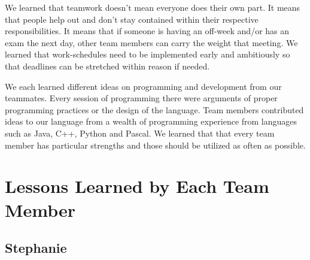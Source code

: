 \documentclass[12pt]{report}
\begin{document}
We learned that teamwork doesn't mean everyone does their own part. It means that people help out and don't stay contained within their respective responsibilities. It means that if someone is having an off-week and/or has an exam the next day, other team members can carry the weight that meeting. We learned that work-schedules need to be implemented early and ambitiously so that deadlines can be stretched within reason if needed.

We each learned different ideas on programming and development from our teammates. Every session of programming there were arguments of proper programming practices or the design of the language. Team members contributed ideas to our language from a wealth of programming experience from languages such as Java, C++, Python and Pascal. We learned that that every team member has particular strengths and those should be utilized as often as possible.

\section{Lessons Learned by Each Team Member}

\subsection{Stephanie}
\end{document}

